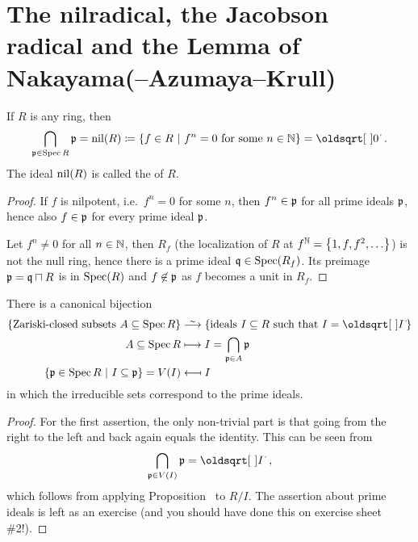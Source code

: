 \documentclass[a4paper,parskip=half,numbers=enddot, DIV=12, headheight=30pt]{scrreprt}
\begin{document}
\section{The nilradical, the Jacobson radical and the Lemma of Nakayama(--Azumaya--Krull)}

\begin{prop}
    If $R$ is any ring, then 
    \begin{align*}
    	\bigcap_{\pp\in\Spec R} \pp =\nil(R) \coloneqq \left\{f\in R\st f^n=0 \text{ for some } n\in\IN\right\} = \sqrt{0}\;.
    \end{align*}
    The ideal $\operatorname{nil}(R)$ is called the  of $R$.
\end{prop}
\begin{proof}
    If $f$ is nilpotent, i.e.\ $f^n=0$ for some $n$, then $f^n\in\mathfrak{p}$ for all prime ideals $\mathfrak{p}$, hence also $f\in\mathfrak{p}$ for every prime ideal $\mathfrak{p}$. 
    
    Let $f^n\neq 0$ for all $n\in \mathbb{N}$, then $R_f$ (the localization of $R$ at $f^{\mathbb{N}}=\left\{1,f,f^2,\ldots\right\}$) is not the null ring, hence there is a prime ideal $\mathfrak{q}\in\operatorname{Spec}(R_f)$. Its preimage $\mathfrak{p}=\mathfrak{q}\sqcap R$ is in $\operatorname{Spec}(R)$ and $f\not \in\mathfrak{p}$ as $f$ becomes a unit in $R_f$.
\end{proof}
\begin{cor}
    There is a canonical bijection 
    \begin{align*}
	    \left\{\text{Zariski-closed subsets }A\subseteq \Spec R\right\}&\isomorphism \left\{\text{ideals }I\subseteq R\text{ such that }I=\sqrt{I}\right\}\\
        A \subseteq \Spec R &\longmapsto I = \bigcap_{\pp\in A} \pp\\
        \left\{\pp\in \Spec R\st I\subseteq \pp\right\}=V(I)&\longmapsfrom I
    \end{align*}
    in which the irreducible sets correspond to the prime ideals.
\end{cor}
\begin{proof}
    For the first assertion, the only non-trivial part is that going from the right to the left and back again equals the identity. This can be seen from 
    \begin{align}\lbl{eq:PrimeCapRadical}
        \bigcap_{\pp\in V(I)}\pp = \sqrt{I}\;,
    \end{align}
    which follows from applying Proposition~ to $R/I$. The assertion about prime ideals is left as an exercise (and you should have done this on exercise sheet \#2!).
\end{proof}
\end{document}
